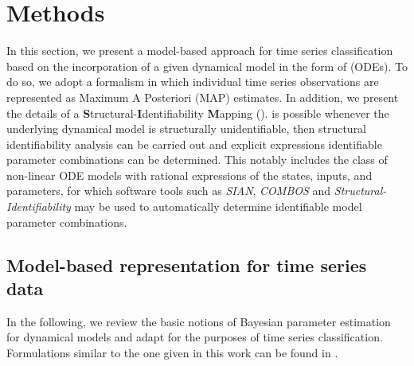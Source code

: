 \section{Methods}\label{sec:methods}

In this section, we present a model-based approach for time series classification based on the incorporation of a given dynamical model in the form of  (ODEs). 
To do so, we adopt a formalism in which individual time series observations are represented as Maximum A Posteriori (MAP) estimates.
In addition, we present the details of %
 a \textbf{S}tructural-\textbf{I}dentifiability \textbf{M}apping (\myMethod{}). 
 is possible whenever the underlying dynamical model is structurally unidentifiable, then structural identifiability analysis can be carried out and explicit expressions  identifiable parameter combinations can be determined. 
This notably includes the class of non-linear ODE models with rational expressions of the states, inputs, and parameters, for which software tools such as \emph{SIAN}\cite{Ilmer2021}, \emph{COMBOS}\cite{meshkat2014COMBOS} and \emph{Structural-Identifiability}\cite{dong2023differential} may be used to automatically determine identifiable model parameter combinations\cite{Rey_Barreiro2023}.


\subsection{Model-based representation for time series data}
In the following, we review the basic notions of Bayesian parameter estimation for dynamical models and adapt  for the purposes of time series classification.
Formulations similar to the one given in this work can be found in \cite{coelho2011bayesian, shen2017classification, linden2022bayesian}.

